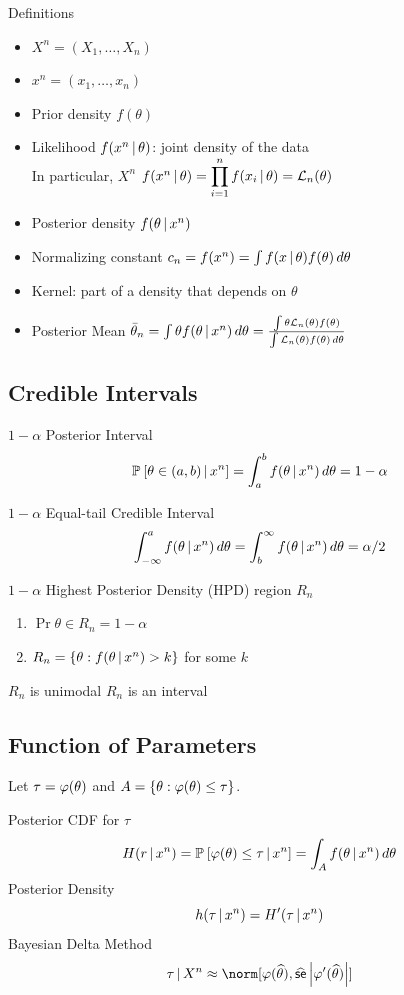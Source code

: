 \documentclass[landscape]{article}
\begin{document}
\begin{multicols*}{2}
Definitions
\begin{itemize}
  \item $X^n = (X_1,\ldots,X_n)$
  \item $x^n = (x_1,\ldots,x_n)$
  \item Prior density $f(\theta)$
  \item Likelihood $f(x^n \,|\, \theta)$: joint density of the data\\ 
    In particular, $X^n$ \iid \imp $f(x^n\,|\,\theta) = 
    \displaystyle\prod_{i=1}^n f(x_i\,|\,\theta) = \mathcal{L}_n(\theta)$
  \item Posterior density $f(\theta\,|\, x^n)$
  \item Normalizing constant $c_n = f(x^n) 
    = \int f(x\,|\,\theta)f(\theta)\,d\theta$
  \item Kernel: part of a density that depends on $\theta$
  \item Posterior Mean $\bar\theta_n 
    = \int\theta f(\theta\,|\, x^n)\,d\theta
    = \frac{\int\theta\mathcal{L}_n(\theta)f(\theta)}
           {\int\mathcal{L}_n(\theta)f(\theta)\,d\theta}$
\end{itemize}

\subsection{Credible Intervals}
$1-\alpha$ Posterior Interval
$$\mathbb{P}_{}\left[\theta\in (a,b)\,|\, x^n\right] 
= \int_{a}^{b} f(\theta\,|\, x^n)\,d\theta 
= 1-\alpha$$

$1-\alpha$ Equal-tail Credible Interval
$$\int_{-\infty}^{a} f(\theta\,|\, x^n)\,d\theta
= \int_{b}^{\infty} f(\theta\,|\, x^n)\,d\theta = \alpha/2$$

$1-\alpha$ Highest Posterior Density (HPD) region $R_n$
\begin{enumerate}
  \item $\Pr{\theta\in R_n} = 1-\alpha$
  \item $R_n = \left\{ \theta: f(\theta\,|\, x^n) > k \right\}$ for some $k$
\end{enumerate}
$R_n$ is unimodal \imp $R_n$ is an interval

\subsection{Function of Parameters}
Let $\tau = \varphi(\theta)$ and $A =
\left\{ \theta:\varphi(\theta) \le \tau \right\}$. 

Posterior CDF for $\tau$
$$H(r\,|\, x^n) 
= \mathbb{P}_{}\left[\varphi(\theta) \le \tau\,|\, x^n\right] 
= \int_A f(\theta \,|\, x^n)\,d\theta$$
Posterior Density
$$h(\tau\,|\, x^n) = H^\prime(\tau\,|\, x^n)$$
Bayesian Delta Method
$$\tau\giv X^n \approx \norm[\transform(\that),
\sehat\left|\transform^\prime(\that)\right|]$$


\end{multicols*}
\end{document}
